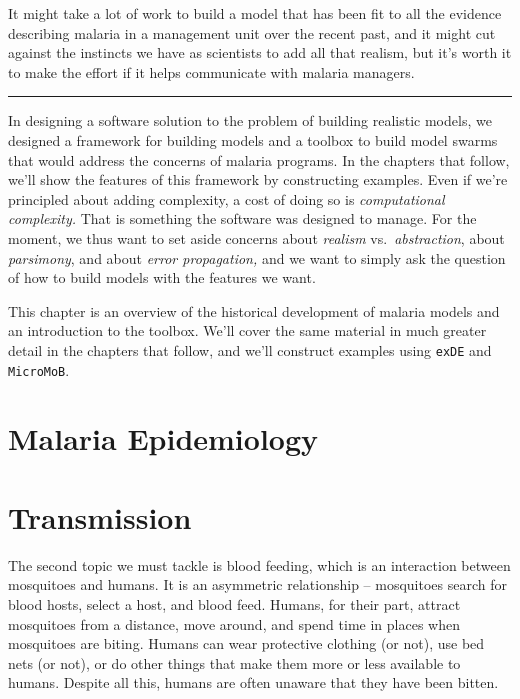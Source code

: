 \documentclass[
]{book}
\begin{document}
It might take a lot of work to build a model that has been fit to all the evidence describing malaria in a management unit over the recent past, and it might cut against the instincts we have as scientists to add all that realism, but it's worth it to make the effort if it helps communicate with malaria managers.

\begin{center}\rule{0.5\linewidth}{0.5pt}\end{center}

In designing a software solution to the problem of building realistic models, we designed a framework for building models and a toolbox to build model swarms that would address the concerns of malaria programs. In the chapters that follow, we'll show the features of this framework by constructing examples. Even if we're principled about adding complexity, a cost of doing so is \emph{computational complexity.} That is something the software was designed to manage. For the moment, we thus want to set aside concerns about \emph{realism} vs.~\emph{abstraction}, about \emph{parsimony}, and about \emph{error propagation,} and we want to simply ask the question of how to build models with the features we want.

This chapter is an overview of the historical development of malaria models and an introduction to the toolbox. We'll cover the same material in much greater detail in the chapters that follow, and we'll construct examples using \texttt{exDE} and \texttt{MicroMoB}.

\section{Malaria Epidemiology}\label{malaria-epidemiology}

\section{Transmission}\label{transmission}

The second topic we must tackle is blood feeding, which is an interaction between mosquitoes and humans. It is an asymmetric relationship -- mosquitoes search for blood hosts, select a host, and blood feed. Humans, for their part, attract mosquitoes from a distance, move around, and spend time in places when mosquitoes are biting. Humans can wear protective clothing (or not), use bed nets (or not), or do other things that make them more or less available to humans. Despite all this, humans are often unaware that they have been bitten.
\end{document}
